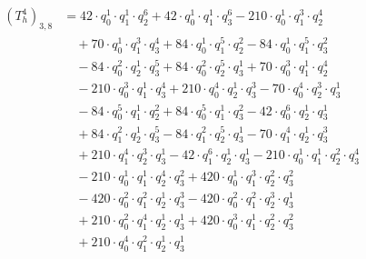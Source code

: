 \begin{align*}(T_{h}^4)_{3,8}&=42\cdot q_0^{1}\cdot q_1^{1}\cdot q_2^{6}+42\cdot q_0^{1}\cdot q_1^{1}\cdot q_3^{6}-210\cdot q_0^{1}\cdot q_1^{3}\cdot q_2^{4}\\
&\quad +70\cdot q_0^{1}\cdot q_1^{3}\cdot q_3^{4}+84\cdot q_0^{1}\cdot q_1^{5}\cdot q_2^{2}-84\cdot q_0^{1}\cdot q_1^{5}\cdot q_3^{2}\\
&\quad -84\cdot q_0^{2}\cdot q_2^{1}\cdot q_3^{5}+84\cdot q_0^{2}\cdot q_2^{5}\cdot q_3^{1}+70\cdot q_0^{3}\cdot q_1^{1}\cdot q_2^{4}\\
&\quad -210\cdot q_0^{3}\cdot q_1^{1}\cdot q_3^{4}+210\cdot q_0^{4}\cdot q_2^{1}\cdot q_3^{3}-70\cdot q_0^{4}\cdot q_2^{3}\cdot q_3^{1}\\
&\quad -84\cdot q_0^{5}\cdot q_1^{1}\cdot q_2^{2}+84\cdot q_0^{5}\cdot q_1^{1}\cdot q_3^{2}-42\cdot q_0^{6}\cdot q_2^{1}\cdot q_3^{1}\\
&\quad +84\cdot q_1^{2}\cdot q_2^{1}\cdot q_3^{5}-84\cdot q_1^{2}\cdot q_2^{5}\cdot q_3^{1}-70\cdot q_1^{4}\cdot q_2^{1}\cdot q_3^{3}\\
&\quad +210\cdot q_1^{4}\cdot q_2^{3}\cdot q_3^{1}-42\cdot q_1^{6}\cdot q_2^{1}\cdot q_3^{1}-210\cdot q_0^{1}\cdot q_1^{1}\cdot q_2^{2}\cdot q_3^{4}\\
&\quad -210\cdot q_0^{1}\cdot q_1^{1}\cdot q_2^{4}\cdot q_3^{2}+420\cdot q_0^{1}\cdot q_1^{3}\cdot q_2^{2}\cdot q_3^{2}\\
&\quad -420\cdot q_0^{2}\cdot q_1^{2}\cdot q_2^{1}\cdot q_3^{3}-420\cdot q_0^{2}\cdot q_1^{2}\cdot q_2^{3}\cdot q_3^{1}\\
&\quad +210\cdot q_0^{2}\cdot q_1^{4}\cdot q_2^{1}\cdot q_3^{1}+420\cdot q_0^{3}\cdot q_1^{1}\cdot q_2^{2}\cdot q_3^{2}\\
&\quad +210\cdot q_0^{4}\cdot q_1^{2}\cdot q_2^{1}\cdot q_3^{1}\end{align*}
